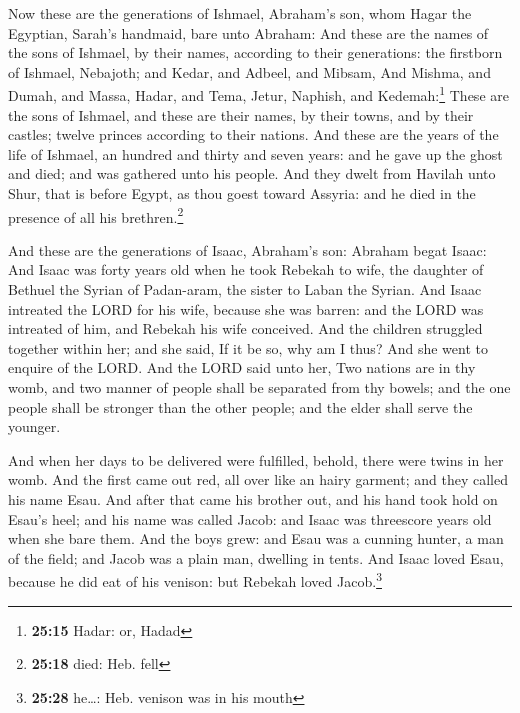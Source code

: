  Now these are the generations of Ishmael, Abraham's son,
whom Hagar the Egyptian, Sarah's handmaid, bare unto Abraham:
 And these are the names of the sons of Ishmael, by their
names, according to their generations: the firstborn of Ishmael,
Nebajoth; and Kedar, and Adbeel, and Mibsam,  And Mishma,
and Dumah, and Massa,  Hadar, and Tema, Jetur, Naphish,
and Kedemah:\footnote{\textbf{25:15} Hadar: or, Hadad} 
These are the sons of Ishmael, and these are their names, by their
towns, and by their castles; twelve princes according to their nations.
 And these are the years of the life of Ishmael, an
hundred and thirty and seven years: and he gave up the ghost and died;
and was gathered unto his people.  And they dwelt from
Havilah unto Shur, that is before Egypt, as thou goest toward Assyria:
and he died in the presence of all his brethren.\footnote{\textbf{25:18}
  died: Heb. fell}

 And these are the generations of Isaac, Abraham's son:
Abraham begat Isaac:  And Isaac was forty years old when
he took Rebekah to wife, the daughter of Bethuel the Syrian of
Padan-aram, the sister to Laban the Syrian.  And Isaac
intreated the LORD for his wife, because she was barren: and the LORD
was intreated of him, and Rebekah his wife conceived. 
And the children struggled together within her; and she said, If it be
so, why am I thus? And she went to enquire of the LORD. 
And the LORD said unto her, Two nations are in thy womb, and two manner
of people shall be separated from thy bowels; and the one people shall
be stronger than the other people; and the elder shall serve the
younger.

 And when her days to be delivered were fulfilled,
behold, there were twins in her womb.  And the first came
out red, all over like an hairy garment; and they called his name Esau.
 And after that came his brother out, and his hand took
hold on Esau's heel; and his name was called Jacob: and Isaac was
threescore years old when she bare them.  And the boys
grew: and Esau was a cunning hunter, a man of the field; and Jacob was a
plain man, dwelling in tents.  And Isaac loved Esau,
because he did eat of his venison: but Rebekah loved Jacob.\footnote{\textbf{25:28}
  he\ldots: Heb. venison was in his mouth}

